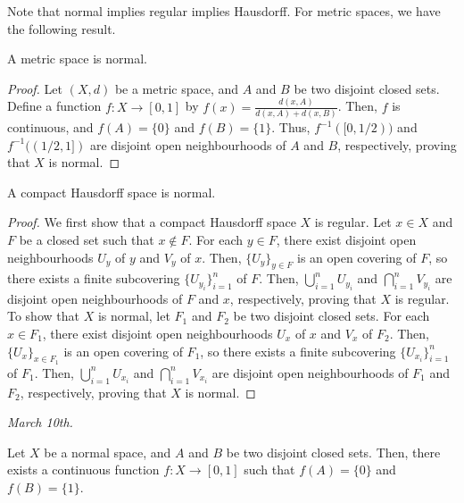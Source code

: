 Note that normal implies regular implies Hausdorff. For metric spaces, we have the following result.

\begin{lemma}
    A metric space is normal.
\end{lemma}
\begin{proof}
    Let $(X,d)$ be a metric space, and $A$ and $B$ be two disjoint closed sets. Define a function $f:X \to [0,1]$ by $f(x) = \frac{d(x,A)}{d(x,A) + d(x,B)}$. Then, $f$ is continuous, and $f(A) = \{0\}$ and $f(B) = \{1\}$. Thus, $f^{-1}([0,1/2))$ and $f^{-1}((1/2,1])$ are disjoint open neighbourhoods of $A$ and $B$, respectively, proving that $X$ is normal.
\end{proof}

\begin{theorem}
    A compact Hausdorff space is normal.
\end{theorem}
\begin{proof}
    We first show that a compact Hausdorff space $X$ is regular. Let $x \in X$ and $F$ be a closed set such that $x \notin F$. For each $y \in F$, there exist disjoint open neighbourhoods $U_{y}$ of $y$ and $V_{y}$ of $x$. Then, $\{U_{y}\}_{y \in F}$ is an open covering of $F$, so there exists a finite subcovering $\{U_{y_{i}}\}_{i=1}^{n}$ of $F$. Then, $\bigcup_{i=1}^{n} U_{y_{i}}$ and $\bigcap_{i=1}^{n} V_{y_{i}}$ are disjoint open neighbourhoods of $F$ and $x$, respectively, proving that $X$ is regular. To show that $X$ is normal, let $F_{1}$ and $F_{2}$ be two disjoint closed sets. For each $x \in F_{1}$, there exist disjoint open neighbourhoods $U_{x}$ of $x$ and $V_{x}$ of $F_{2}$. Then, $\{U_{x}\}_{x \in F_{1}}$ is an open covering of $F_{1}$, so there exists a finite subcovering $\{U_{x_{i}}\}_{i=1}^{n}$ of $F_{1}$. Then, $\bigcup_{i=1}^{n} U_{x_{i}}$ and $\bigcap_{i=1}^{n} V_{x_{i}}$ are disjoint open neighbourhoods of $F_{1}$ and $F_{2}$, respectively, proving that $X$ is normal.
\end{proof}


\textit{March 10th.}

\begin{theorem}
    Let $X$ be a normal space, and $A$ and $B$ be two disjoint closed sets. Then, there exists a continuous function $f:X \to [0,1]$ such that $f(A) = \{0\}$ and $f(B) = \{1\}$.
\end{theorem}

